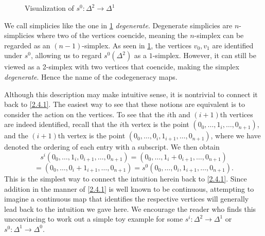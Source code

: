 \begin{intuition}
\begin{itemize}
\begin{figure}[ht]
            \caption{Visualization of $s^0 : \Delta^2\to\Delta^1$}
            \label{fig:5}
        \end{figure}
        We call simplicies like the one in \cref{fig:5} \emph{degenerate}. Degenerate simplicies are $n$-simplicies where two of the vertices coencide, meaning the $n$-simplex can be regarded as an $(n-1)$-simplex. As seen in \cref{fig:5}, the vertices $v_0,v_1$ are identified under $s^0$, allowing us to regard $s^0(\Delta^2)$ as a $1$-simplex. However, it can still be viewed as a 2-simplex with two vertices that coencide, making the simplex \emph{degenerate}. Hence the name of the codegeneracy maps.

        Although this description may make intuitive sense, it is nontrivial to connect it back to \cref{2.4.1}. The easiest way to see that these notions are equivalent is to consider the action on the vertices. To see that the $i$th and $(i+1)$th vertices are indeed identified, recall that the $i$th vertex is the point $(0_0,\ldots,1_i,\ldots,0_{n+1})$, and the $(i+1)$th vertex is the point $(0_0,\ldots,0_i,1_{i+1},\ldots,0_{n+1})$, where we have denoted the ordering of each entry with a subscript. We then obtain
        \[
        s^i(0_0,\ldots,1_i,0_{i+1},\ldots,0_{n+1}) = (0_0,\ldots,1_i+0_{i+1},\ldots,0_{n+1})
        \]
        \[
         = (0_0,\ldots,0_i+1_{i+1},\ldots,0_{n+1})=s^0(0_0,\ldots,0_i,1_{i+1},\ldots,0_{n+1}).
        \]
        This is the simplest way to connect the intuition herein back to \cref{2.4.1}. Since addition in the manner of \cref{2.4.1} is well known to be continuous, attempting to imagine a continuous map that identifies the respective vertices will generally lead back to the intuition we gave here. We encourage the reader who finds this unconvincing to work out a simple toy example for some $s^i : \Delta^2\to\Delta^1$ or $s^0 : \Delta^1\to\Delta^0$.
    \end{itemize}
\end{intuition}

